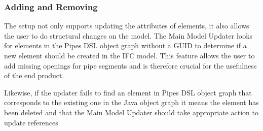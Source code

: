\subsubsection{Adding and Removing} The setup not only supports updating the attributes of elements, it also allows the user to do structural changes on the model. The Main Model Updater looks for elements in the Pipes DSL object graph without a GUID to determine if a new element should be created in the IFC model. This feature allows the user to add missing openings for pipe segments and is therefore crucial for the usefulness of the end product.

Likewise, if the updater fails to find an element in Pipes DSL object graph that corresponds to the existing one in the Java object graph it means the element has been deleted and that the Main Model Updater should take appropriate action to update references
